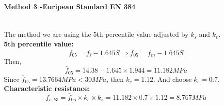 \paragraph{Method 3 -Euripean Standard EN 384} \text{ } \\[2mm]
The method we are using the 5th percentile value adjusted by  $k_s$ and $k_v$. \\[4mm]
\textbf{5th percentile value:}
\[f_{05} = f_i - 1.645\bar{S} \Rightarrow \bar{f}_{05} = f_m - 1.645 \bar{S}\]
Then,
\[\bar{f}_{05} = 14.38 - 1.645\times 1.944 = 11.182 MPa\]
Since $\bar{f}_{05} = 13.7664 MPa <  30 MPa$, then $k_v = 1.12$. And choose $k_s = 0.7$. \\[2mm]
\textbf{Characteristic resistance:}
\[f_{v,k3} = \bar{f}_{05} \times k_s \times k_z = 11.182 \times 0.7 \times 1.12 = \boxed{8.767 MPa} \]

